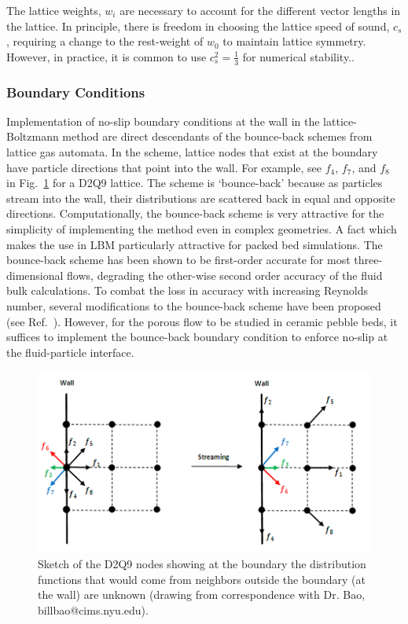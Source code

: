 The lattice weights, $w_i$ are necessary to account for the different vector lengths in the lattice. In principle, there is freedom in choosing the lattice speed of sound, $c_s$, requiring a change to the rest-weight of $w_0$ to maintain lattice symmetry. However, in practice, it is common to use $c_s^2 = \frac{1}{3}$ for numerical stability.\cite{Latt2007,succi2001lattice}.




\subsubsection{Boundary Conditions}
Implementation of no-slip boundary conditions at the wall in the lattice-Boltzmann method are direct descendants of the bounce-back schemes from lattice gas automata. In the scheme, lattice nodes that exist at the boundary have particle directions that point into the wall. For example, see $f_4$, $f_7$, and $f_8$ in Fig.~\ref{fig:wall-lattice-bc} for a D2Q9 lattice. The scheme is `bounce-back' because as particles stream into the wall, their distributions are scattered back in equal and opposite directions. Computationally, the bounce-back scheme is very attractive for the simplicity of implementing the method even in complex geometries. A fact which makes the use in LBM particularly attractive for packed bed simulations.\cite{Chen1998a} The bounce-back scheme has been shown to be first-order accurate for most three-dimensional flows, degrading the other-wise second order accuracy of the fluid bulk calculations.\cite{Zou1997,Chen1998a} To combat the loss in accuracy with increasing Reynolds number, several modifications to the bounce-back scheme have been proposed (see Ref.~\cite{Chen1998a}). However, for the porous flow to be studied in ceramic pebble beds, it suffices to implement the bounce-back boundary condition to enforce no-slip at the fluid-particle interface.\cite{Chen1998a,Luo2003a}

\begin{figure}[t]
	\centering
	\includegraphics[width=\singleimagewidth]{figures/lbm/ongrid}
	\caption{Sketch of the D2Q9 nodes showing at the boundary the distribution functions that would come from neighbors outside the boundary (at the wall) are unknown (drawing from correspondence with Dr. Bao, billbao@cims.nyu.edu).}\label{fig:wall-lattice-bc}
\end{figure}


